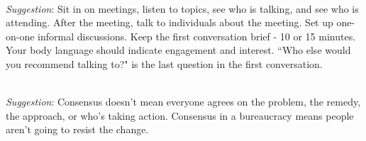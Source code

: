 \ \\
\textit{Suggestion}: Sit in on meetings, listen to topics, see who is talking, and see who is attending. After the meeting, talk to individuals about the meeting. Set up one-on-one informal discussions. Keep the first conversation brief - 10 or 15 minutes. Your body language should indicate engagement and interest. ``Who else would you recommend talking to?" is the last question in the first conversation.

\ \\
\textit{Suggestion}: Consensus doesn't mean everyone agrees on the problem, the remedy, the approach, or who's taking action. Consensus in a bureaucracy means people aren't going to resist the change.